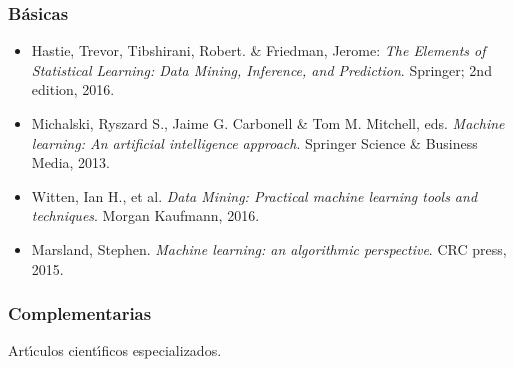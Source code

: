 \documentclass[10 pt]{article}
\begin{document}
\subsubsection{B\'{a}sicas}

 \begin{itemize}[itemsep=0em]

 \item{Hastie, Trevor, Tibshirani, Robert. \& Friedman, Jerome: {\em
       The Elements of Statistical Learning: Data Mining, Inference,
       and Prediction}. Springer; 2nd edition, 2016.}

   \item{Michalski, Ryszard S., Jaime G. Carbonell \& Tom M. Mitchell,
   eds. {\em Machine learning: An artificial intelligence
     approach}. Springer Science \& Business Media, 2013.}

 \item{Witten, Ian H., et al. {\em Data Mining: Practical machine learning
     tools and techniques}. Morgan Kaufmann, 2016.}

 \item{Marsland, Stephen. {\em Machine learning: an algorithmic
       perspective}. CRC press, 2015.}
   
\end{itemize}

\subsubsection{Complementarias}

Art\'{\i}culos cient\'{\i}ficos especializados.

\label{final} %


\end{document}
